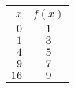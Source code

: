 \begin{tabular}{rc} \toprule
$x$  & $f(x)$ \\\midrule
$0$  & $1$    \\[6pt]
$1$  & $3$    \\[6pt]
$4$  & $5$    \\[6pt]
$9$  & $7$    \\[6pt]
$16$ & $9$    \\\bottomrule
\end{tabular}
